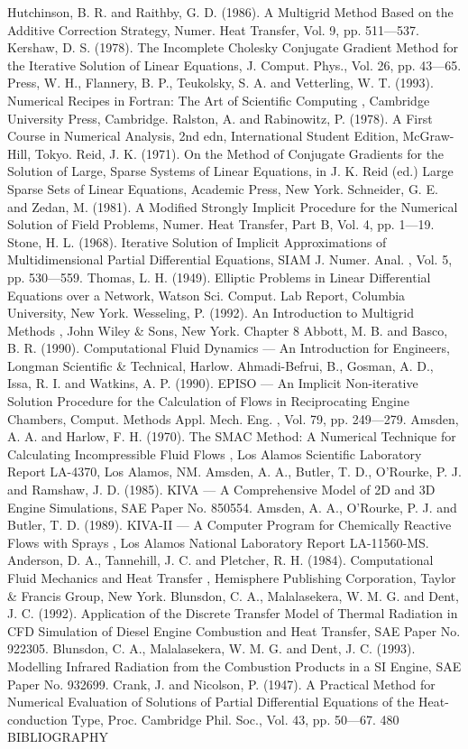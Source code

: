 \documentclass[11pt,a4paper,openany,fontset=none]{ctexbook}
\begin{document}
\begin{sloppypar}
{\small Hutchinson, B. R. and Raithby, G. D. (1986). A Multigrid Method Based on the Additive Correction Strategy, Numer. Heat Transfer, Vol. 9, pp. 511—537. Kershaw, D. S. (1978). The Incomplete Cholesky Conjugate Gradient Method for the Iterative Solution of Linear Equations, J. Comput. Phys., Vol. 26, pp. 43—65. Press, W. H., Flannery, B. P., Teukolsky, S. A. and Vetterling, W. T. (1993). Numerical Recipes in Fortran: The Art of Scientific Computing , Cambridge University Press, Cambridge. Ralston, A. and Rabinowitz, P. (1978). A First Course in Numerical Analysis, 2nd edn, International Student Edition, McGraw-Hill, Tokyo. Reid, J. K. (1971). On the Method of Conjugate Gradients for the Solution of Large, Sparse Systems of Linear Equations, in J. K. Reid (ed.) Large Sparse Sets of Linear Equations, Academic Press, New York. Schneider, G. E. and Zedan, M. (1981). A Modified Strongly Implicit Procedure for the Numerical Solution of Field Problems, Numer. Heat Transfer, Part B, Vol. 4, pp. 1—19. Stone, H. L. (1968). Iterative Solution of Implicit Approximations of Multidimensional Partial Differential Equations, SIAM J. Numer. Anal. , Vol. 5, pp. 530—559. Thomas, L. H. (1949). Elliptic Problems in Linear Differential Equations over a Network, Watson Sci. Comput. Lab Report, Columbia University, New York. Wesseling, P. (1992). An Introduction to Multigrid Methods , John Wiley \& Sons, New York. Chapter 8 Abbott, M. B. and Basco, B. R. (1990). Computational Fluid Dynamics — An Introduction for Engineers, Longman Scientific \& Technical, Harlow. Ahmadi-Befrui, B., Gosman, A. D., Issa, R. I. and Watkins, A. P. (1990). EPISO — An Implicit Non-iterative Solution Procedure for the Calculation of Flows in Reciprocating Engine Chambers, Comput. Methods Appl. Mech. Eng. , Vol. 79, pp. 249—279. Amsden, A. A. and Harlow, F. H. (1970). The SMAC Method: A Numerical Technique for Calculating Incompressible Fluid Flows , Los Alamos Scientific Laboratory Report LA-4370, Los Alamos, NM. Amsden, A. A., Butler, T. D., O’Rourke, P. J. and Ramshaw, J. D. (1985). KIVA — A Comprehensive Model of 2D and 3D Engine Simulations, SAE Paper No. 850554. Amsden, A. A., O’Rourke, P. J. and Butler, T. D. (1989). KIVA-II — A Computer Program for Chemically Reactive Flows with Sprays , Los Alamos National Laboratory Report LA-11560-MS. Anderson, D. A., Tannehill, J. C. and Pletcher, R. H. (1984). Computational Fluid Mechanics and Heat Transfer , Hemisphere Publishing Corporation, Taylor \& Francis Group, New York. Blunsdon, C. A., Malalasekera, W. M. G. and Dent, J. C. (1992). Application of the Discrete Transfer Model of Thermal Radiation in CFD Simulation of Diesel Engine Combustion and Heat Transfer, SAE Paper No. 922305. Blunsdon, C. A., Malalasekera, W. M. G. and Dent, J. C. (1993). Modelling Infrared Radiation from the Combustion Products in a SI Engine, SAE Paper No. 932699. Crank, J. and Nicolson, P. (1947). A Practical Method for Numerical Evaluation of Solutions of Partial Differential Equations of the Heat-conduction Type, Proc. Cambridge Phil. Soc., Vol. 43, pp. 50—67. 480 BIBLIOGRAPHY}\par

\end{sloppypar}
\end{document}
